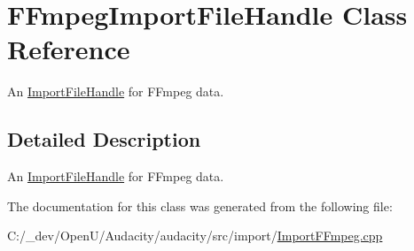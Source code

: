 \hypertarget{class_f_fmpeg_import_file_handle}{}\section{F\+Fmpeg\+Import\+File\+Handle Class Reference}
\label{class_f_fmpeg_import_file_handle}


An \hyperlink{class_import_file_handle}{Import\+File\+Handle} for F\+Fmpeg data.  




\subsection{Detailed Description}
An \hyperlink{class_import_file_handle}{Import\+File\+Handle} for F\+Fmpeg data. 

The documentation for this class was generated from the following file\+:\begin{DoxyCompactItemize}
\item 
C\+:/\+\_\+dev/\+Open\+U/\+Audacity/audacity/src/import/\hyperlink{_import_f_fmpeg_8cpp}{Import\+F\+Fmpeg.\+cpp}\end{DoxyCompactItemize}

